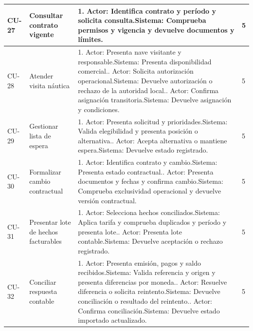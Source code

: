 \begin{longtable}{L{14mm}L{27mm}L{97mm}R{9mm}}
CU-27 & Consultar contrato vigente & 1. Actor: Identifica contrato y período y solicita consulta.\newline Sistema: Comprueba permisos y vigencia y devuelve documentos y límites. & 5\\\hline
CU-28 & Atender visita náutica & 1. Actor: Presenta nave visitante y responsable.\newline Sistema: Presenta disponibilidad comercial.. Actor: Solicita autorización operacional.\newline Sistema: Devuelve autorización o rechazo de la autoridad local.. Actor: Confirma asignación transitoria.\newline Sistema: Devuelve asignación y condiciones. & 5\\\hline
CU-29 & Gestionar lista de espera & 1. Actor: Presenta solicitud y prioridades.\newline Sistema: Valida elegibilidad y presenta posición o alternativa.. Actor: Acepta alternativa o mantiene espera.\newline Sistema: Devuelve estado registrado. & 5\\\hline
CU-30 & Formalizar cambio contractual & 1. Actor: Identifica contrato y cambio.\newline Sistema: Presenta estado contractual.. Actor: Presenta documentos y fechas y confirma cambio.\newline Sistema: Comprueba exclusividad operacional y devuelve versión contractual. & 5\\\hline
CU-31 & Presentar lote de hechos facturables & 1. Actor: Selecciona hechos conciliados.\newline Sistema: Aplica tarifa y comprueba duplicados y período y presenta lote.. Actor: Presenta lote contable.\newline Sistema: Devuelve aceptación o rechazo registrado. & 5\\\hline
CU-32 & Conciliar respuesta contable & 1. Actor: Presenta emisión, pagos y saldo recibidos.\newline Sistema: Valida referencia y origen y presenta diferencias por moneda.. Actor: Resuelve diferencia o solicita reintento.\newline Sistema: Devuelve conciliación o resultado del reintento.. Actor: Confirma conciliación.\newline Sistema: Devuelve estado importado actualizado. & 5\\\hline

\end{longtable}

